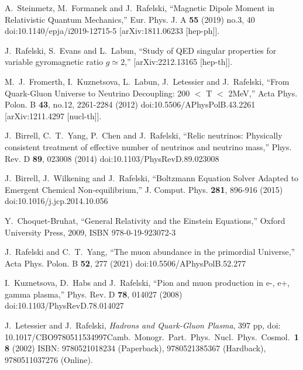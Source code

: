 \documentclass[universe,article,submit,moreauthors,pdftex,a4paper]{Definitions/mdpi}
\begin{document}
\begin{thebibliography}{99}
A.~Steinmetz, M.~Formanek and J.~Rafelski,
``Magnetic Dipole Moment in Relativistic Quantum Mechanics,''
Eur. Phys. J. A \textbf{55} (2019) no.3, 40
doi:10.1140/epja/i2019-12715-5
[arXiv:1811.06233 [hep-ph]].

J.~Rafelski, S.~Evans and L.~Labun,
``Study of QED singular properties for variable gyromagnetic ratio $g\simeq 2$,''
[arXiv:2212.13165 [hep-th]].


M.~J.~Fromerth, I.~Kuznetsova, L.~Labun, J.~Letessier and J.~Rafelski,
``From Quark-Gluon Universe to Neutrino Decoupling: 200 \ensuremath{<} T \ensuremath{<} 2MeV,''
Acta Phys. Polon. B \textbf{43}, no.12, 2261-2284 (2012)
doi:10.5506/APhysPolB.43.2261
[arXiv:1211.4297 [nucl-th]].

J.~Birrell, C.~T.~Yang, P.~Chen and J.~Rafelski,
``Relic neutrinos: Physically consistent treatment of effective number of neutrinos and neutrino mass,''
Phys. Rev. D \textbf{89}, 023008 (2014)
doi:10.1103/PhysRevD.89.023008


J.~Birrell, J.~Wilkening and J.~Rafelski,
``Boltzmann Equation Solver Adapted to Emergent Chemical Non-equilibrium,''
J. Comput. Phys. \textbf{281}, 896-916 (2015)
doi:10.1016/j.jcp.2014.10.056

Y.~Choquet-Bruhat,
``General Relativity and the Einstein Equations,''
Oxford University Press, 2009,
ISBN 978-0-19-923072-3

J.~Rafelski and C.~T.~Yang,
``The muon abundance in the primordial Universe,''
Acta Phys. Polon. B \textbf{52}, 277 (2021)
doi:10.5506/APhysPolB.52.277

I.~Kuznetsova, D.~Habs and J.~Rafelski,
``Pion and muon production in e-, e+, gamma plasma,''
Phys. Rev. D \textbf{78}, 014027 (2008)
doi:10.1103/PhysRevD.78.014027


J.~Letessier and J.~Rafelski,
\emph{Hadrons and Quark-Gluon Plasma}, 
397 pp, doi: {10.1017/CBO9780511534997}{Camb.\ Monogr.\ Part.\ Phys.\ Nucl.\ Phys.\ Cosmol.\ {\bf 18} (2002)}
ISBN: 9780521018234 (Paperback), 9780521385367 (Hardback), 9780511037276 (Online).


\end{thebibliography}
\end{document}
